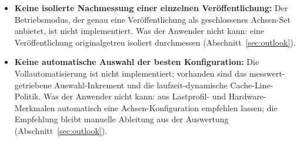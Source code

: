 \begin{nurkurz}
\begin{itemize}
  oder
  ohne perf-Rechte (\texttt{perf\_event\_paranoid}, RAPL-Zonen) erheben.
  \item \textbf{Keine isolierte Nachmessung einer einzelnen Veröffentlichung:} Der Betriebsmodus, der genau
  eine Veröffentlichung als geschlossenes Achsen-Set anbietet, ist nicht implementiert. Was der Anwender
  nicht
  kann: eine Veröffentlichung originalgetreu isoliert durchmessen (Abschnitt~\ref{sec:outlook}).
  \item \textbf{Keine automatische Auswahl der besten Konfiguration:} Die Vollautomatisierung ist nicht
  implementiert; vorhanden sind das messwert-getriebene Auswahl-Inkrement und die laufzeit-dynamische
  Cache-Line-Politik. Was der Anwender nicht kann: aus Lastprofil-
  und Hardware-Merkmalen automatisch eine Achsen-Konfiguration empfehlen lassen; die Empfehlung bleibt
  manuelle Ableitung aus der Auswertung (Abschnitt~\ref{sec:outlook}).
\end{itemize}
\end{nurkurz}

